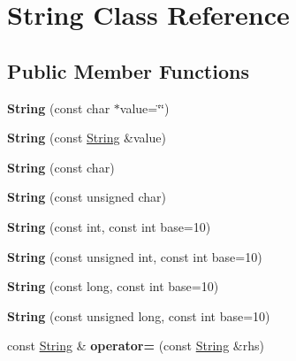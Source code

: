 \hypertarget{class_string}{}\section{String Class Reference}
\label{class_string}
\subsection*{Public Member Functions}
\begin{DoxyCompactItemize}
\item 
{\bfseries String} (const char $\ast$value=\char`\"{}\char`\"{})\hypertarget{class_string_a7f902d8fff17edbac1a65dd809826242}{}\label{class_string_a7f902d8fff17edbac1a65dd809826242}

\item 
{\bfseries String} (const \hyperlink{class_string}{String} \&value)\hypertarget{class_string_aae710b6eceb89026f9a4da319ba041ae}{}\label{class_string_aae710b6eceb89026f9a4da319ba041ae}

\item 
{\bfseries String} (const char)\hypertarget{class_string_a8fae47f6d9436dc8c01be8da557c8562}{}\label{class_string_a8fae47f6d9436dc8c01be8da557c8562}

\item 
{\bfseries String} (const unsigned char)\hypertarget{class_string_a8214a9eab5c3d484b87051bd17aa2d7d}{}\label{class_string_a8214a9eab5c3d484b87051bd17aa2d7d}

\item 
{\bfseries String} (const int, const int base=10)\hypertarget{class_string_a6f763090b66d4f1db447feb8134ce812}{}\label{class_string_a6f763090b66d4f1db447feb8134ce812}

\item 
{\bfseries String} (const unsigned int, const int base=10)\hypertarget{class_string_ad2eeb8af8feb49ef19968c43b12ccef6}{}\label{class_string_ad2eeb8af8feb49ef19968c43b12ccef6}

\item 
{\bfseries String} (const long, const int base=10)\hypertarget{class_string_a7468aaec52653eb6ee2463a917a4d111}{}\label{class_string_a7468aaec52653eb6ee2463a917a4d111}

\item 
{\bfseries String} (const unsigned long, const int base=10)\hypertarget{class_string_ae84dfcbf8b983149a151f4a075e1c0db}{}\label{class_string_ae84dfcbf8b983149a151f4a075e1c0db}

\item 
const \hyperlink{class_string}{String} \& {\bfseries operator=} (const \hyperlink{class_string}{String} \&rhs)\hypertarget{class_string_a948f0764e4c1bc9b0229b588475c12b8}{}\label{class_string_a948f0764e4c1bc9b0229b588475c12b8}


\end{DoxyCompactItemize}
